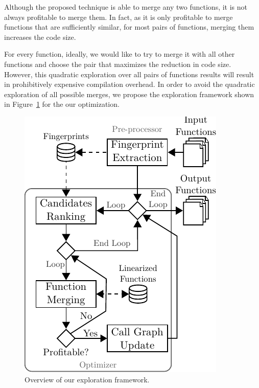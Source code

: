 Although the proposed technique is able to merge any two functions, it is not always profitable to merge them. In fact, as it is only
profitable to merge functions that are sufficiently similar, for most pairs of functions, merging them increases the code size.



For every function, ideally, we would like to try to merge it with all other functions and choose the pair that maximizes the reduction in
code size. However, this quadratic exploration over all pairs of functions results will result in prohibitively expensive compilation
overhead. In order to avoid the quadratic exploration of all possible merges, we propose the exploration framework shown in
Figure~\ref{fig:func-merge-opt-arch} for the our optimization.
\begin{figure}[t!]
  \centering
  \includegraphics[width=0.65\linewidth]{figs/func-merge-opt-arch.pdf}
  \caption{Overview of our exploration framework.}
  \label{fig:func-merge-opt-arch}
\end{figure}

